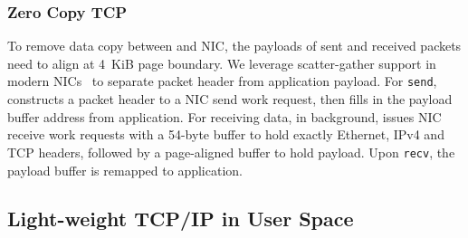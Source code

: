 \subsubsection{Zero Copy TCP}
\label{subsec:zero-copy-tcp}

To remove data copy between \libipc{} and NIC, the payloads of sent and received packets need to align at 4~KiB page boundary. We leverage scatter-gather support in modern NICs~\cite{mellanox} to separate packet header from application payload.
For \texttt{send}, \libipc{} constructs a packet header to a NIC send work request, then fills in the payload buffer address from application. 
For receiving data, in background, \libipc{} issues NIC receive work requests with a 54-byte buffer to hold exactly Ethernet, IPv4 and TCP headers, followed by a page-aligned buffer to hold payload.
Upon \texttt{recv}, the payload buffer is remapped to application.





\subsection{Light-weight TCP/IP in User Space}
\label{subsec:lwip}


